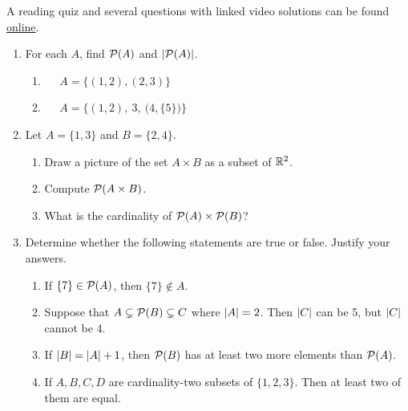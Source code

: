 \begin{exercises}{}{}
	A reading quiz and several questions with linked video solutions can be found \href{http://www.math.uci.edu/~ndonalds/math13/selftest/6-2-power.html}{online}.


	\begin{enumerate}
	  \item For each $A$, find $\mathcal{P}(A)$ and $\left| \mathcal{P}(A)\right|$.
	  \begin{enumerate}
	    \item {} \  \ $A=\bigl\{(1,2),(2,3)\bigr\}$
	    \setcounter{enumii}{3}
	    \item {} \  \ $A=\Big\{(1,2),\ 3,\ \bigl(4,\{5\}\bigr)\Big\}$   
	  \end{enumerate}
		
		
		\item Let $A=\{1,3\}$ and $B=\{2,4\}$.
		\begin{enumerate}
		  \item Draw a picture of the set $A\times B$ as a subset of $\mathbb{R}^2$.
		  \item Compute $\mathcal{P}(A\times B)$.
		  \item What is the cardinality of $\mathcal{P}(A)\times\mathcal{P}(B)$? %
		\end{enumerate}
	  
	  
		\item Determine whether the following statements are true or false. Justify your answers.
	  \begin{enumerate}
	    \item If $\{7\}\in\mathcal{P}(A)$, then $\{7\}\notin A$.
	    \item Suppose that $A\subsetneq\mathcal{P}(B)\subsetneq C$ where $\left| A\right|=2$. Then $\left| C\right|$ can be 5, but $\left| C\right|$ cannot be 4.
	    \item If $\left| B\right|=\left| A\right|+1$, then $\mathcal{P}(B)$ has at least two more elements than $\mathcal{P}(A)$.
	    \item If $A,B,C,D$ are cardinality-two subsets of $\{1,2,3\}$. Then at least two of them are equal. 
	  \end{enumerate}
  

\end{enumerate}
\end{exercises}
